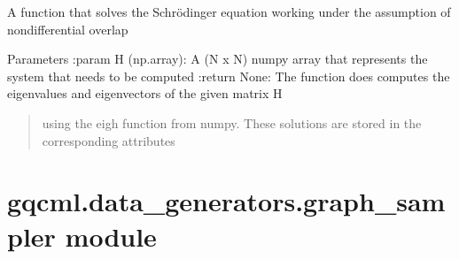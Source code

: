 \documentclass[letterpaper,10pt,english]{sphinxmanual}
\begin{document}
\begin{fulllineitems}
\begin{fulllineitems}
\begin{quote}
\begin{description}
\end{description}\end{quote}

\end{fulllineitems}


\begin{fulllineitems}
\label{\detokenize{modules/gqcml.data_generators:gqcml.data_generators.Huckel.HuckelSolver.solve_ndo}}
A function that solves the Schrödinger equation working under the assumption of non\sphinxhyphen{}differential overlap

Parameters
:param H (np.array): A (N x N) numpy array that represents the system that needs to be computed
:return None: The function does computes the eigenvalues and eigenvectors of the given matrix H
\begin{quote}

using the eigh function from numpy. These solutions are stored in the corresponding attributes
\end{quote}

\end{fulllineitems}


\end{fulllineitems}



\section{gqcml.data\_generators.graph\_sampler module}
\label{\detokenize{modules/gqcml.data_generators:module-gqcml.data_generators.graph_sampler}}\label{\detokenize{modules/gqcml.data_generators:gqcml-data-generators-graph-sampler-module}}
\end{document}
